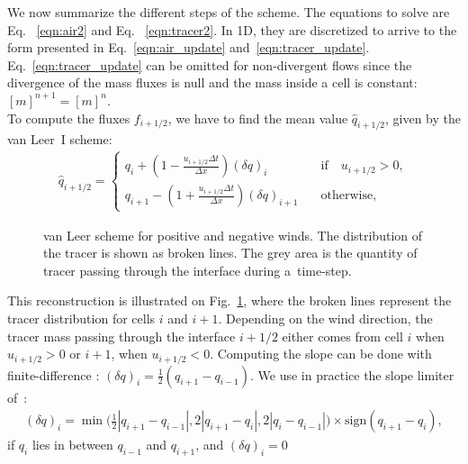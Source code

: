 We now summarize the different steps of the scheme. The equations to solve are
Eq.~\DIFdelbegin %
\DIFdelend \DIFaddbegin \eqref{eqn:air2} \DIFaddend and Eq.~\DIFdelbegin %
\DIFdelend \DIFaddbegin \eqref{eqn:tracer2}\DIFaddend . In 1D, they are discretized to
arrive to the form presented in Eq.~\eqref{eqn:air_update}
and~\eqref{eqn:tracer_update}. Eq.~\eqref{eqn:tracer_update} can be omitted for
non-divergent flows since the divergence of the mass fluxes is null and the
mass inside a cell is constant: $[m]^{n+1} = [m]^{n}$. \\
To compute the fluxes $f_{i+1/2}$, we have to find the mean value
$\widehat{q}_{i+1/2}$, given by the van Leer~I scheme:
\begin{align}
 \widehat{q}_{i+1/2} =
  \begin{cases}
    q_i + \left(1 -  \frac{u_{i+1/2} \Delta t}{\Delta x}\right)(\delta q)_i
    \quad &\text{if} \quad u_{i+1/2} > 0,\\
    q_{i+1} - \left(1 + \frac{u_{i+1/2} \Delta t}{\Delta x}\right) (\delta q)_{i+1}
    \quad &\text{otherwise},
  \end{cases}
  \label{eqn:vanleer1}
\end{align}
\begin{figure}
  \centering
  \caption{van Leer scheme for positive and negative winds. The
  distribution of the tracer is shown as broken lines. The grey area is the
  quantity of tracer passing through the interface during a~time-step.}
\label{fig:van_leer}
\end{figure}
This reconstruction is illustrated on Fig.~\ref{fig:van_leer}, where the broken
lines represent the tracer distribution for cells $i$ and $i+1$. Depending on
the wind direction, the tracer mass passing through the interface $i+1/2$ either
comes from cell $i$ when $u_{i+1/2} > 0$ or $i+1$, when $u_{i+1/2} < 0$. 
Computing the slope can be done with finite-difference :
  $(\delta q)_i = \frac{1}{2} (q_{i+1}-q_{i-1})$.
We use in practice the slope limiter of~\cite{Leer1979}:
\begin{align}
  (\delta q)_i =
  \min\big(\frac{1}{2} |q_{i+1}-q_{i-1}|, 2|q_{i+1}-q_i|, 2|q_i-q_{i-1}|\big)
  \times \text{sign}(q_{i+1} - q_i),
  \label{eqn:slope}
\end{align}
if $q_i$ lies in between $q_{i-1}$ and $q_{i+1}$, and $(\delta q)_i =0$

